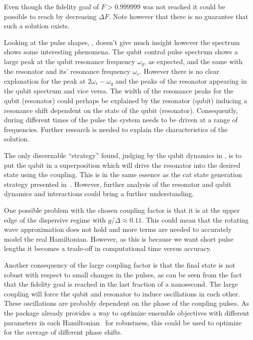 \documentclass[main.tex]{subfiles}
\begin{document}
Even though the fidelity goal of \(F > 0.999999\) was not reached it could be possible to reach by decreasing \(\Delta F\).
Note however that there is no guarantee that such a solution exists.

Looking at the pulse shapes, , doesn't give much insight however the spectrum shows some interesting phenomena.
The qubit control pulse spectrum shows a large peak at the qubit resonance frequency \(\omega_q\), as expected, and the same with the resonator and its' resonance frequency \(\omega_r\).
However there is no clear explanation for the peak at \(2\omega_r-\omega_q\) and the peaks of the resonator appearing in the qubit spectrum and vice versa.
The width of the resonance peaks for the qubit (resonator) could perhaps be explained by the resonator (qubit) inducing a resonance shift dependent on the state of the qubit (resonator).
Consequently, during different times of the pulse the system needs to be driven at a range of frequencies.
Further research is needed to explain the characteristics of the solution.

The only discernable ``strategy'' found, judging by the qubit dynamics in , is to put the qubit in a superposition which will drive the resonator into the desired state using the coupling.
This is in the same essence as the cat state generation strategy presented in~\cite{haroche_exploring_2006}.
However, further analysis of the resonator and qubit dynamics and interactions could bring a further understanding.

One possible problem with the chosen coupling factor is that it is at the upper edge of the dispersive regime with \(g/\Delta\approx 0.11\).
This could mean that the rotating wave approximation does not hold and more terms are needed to accurately model the real Hamiltonian.
However, as this is because we want short pulse lengths it becomes a trade-off in computational time versus accuracy.

Another consequency of the large coupling factor is that the final state is not robust with respect to small changes in the pulses, as can be seen from the fact that the fidelity goal is reached in the last fraction of a nanosecond.
The large coupling will force the qubit and resonator to induce oscillations in each other.
These oscillations are probably dependent on the phase of the coupling pulses.
As the \krotov{} package already provides a way to optimize ensemble objectives with different parameters in each Hamiltonian~\cite{goerz_robustness_2014} for robustness, this could be used to optimize for the average of different phase shifts.
\end{document}

